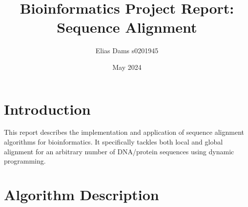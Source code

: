 \documentclass{article}
\title{Bioinformatics Project Report: Sequence Alignment}
\author{Elias Dams s0201945}
\date{May 2024}
\begin{document}
\lstset{language=Python}

\maketitle

\tableofcontents
\pagebreak

\section{Introduction}
This report describes the implementation and application of sequence alignment algorithms for bioinformatics. It specifically tackles both local and global alignment for an arbitrary number of DNA/protein sequences using dynamic programming.

\section{Algorithm Description}
\end{document}
